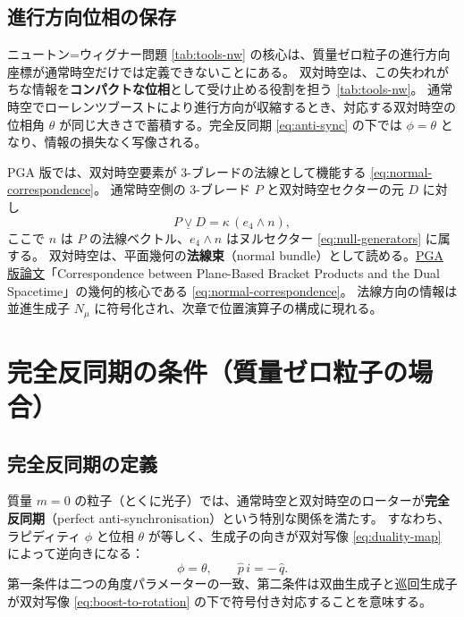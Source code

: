 \documentclass[dvipdfmx,a4paper,oneside]{jsbook}
\numberwithin{equation}{chapter}
\begin{document}
\subsection{進行方向位相の保存}

ニュートン=ウィグナー問題 \eqref{tab:tools-nw} の核心は、質量ゼロ粒子の進行方向座標が通常時空だけでは定義できないことにある。
双対時空は、この失われがちな情報を\textbf{コンパクトな位相}として受け止める役割を担う \eqref{tab:tools-nw}。
通常時空でローレンツブーストにより進行方向が収縮するとき、対応する双対時空の位相角 \(\theta\) が同じ大きさで蓄積する。完全反同期 \eqref{eq:anti-sync} の下では \(\phi = \theta\) となり、情報の損失なく写像される。

PGA 版では、双対時空要素が 3-ブレードの法線として機能する \eqref{eq:normal-correspondence}。
通常時空側の 3-ブレード \(P\) と双対時空セクターの元 \(D\) に対し
\begin{equation}
  P \mathbin{\underline{\vee}} D = \kappa\,(e_4 \wedge n),
  \label{eq:normal-correspondence-chapter}
\end{equation}
ここで \(n\) は \(P\) の法線ベクトル、\(e_4 \wedge n\) はヌルセクター \eqref{eq:null-generators} に属する。
双対時空は、平面幾何の\textbf{法線束}（normal bundle）として読める。\hyperref[sec:sister-manuscripts]{PGA 版論文}「Correspondence between Plane-Based Bracket Products and the Dual Spacetime」の幾何的核心である \eqref{eq:normal-correspondence}。
法線方向の情報は並進生成子 \(N_\mu\) に符号化され、次章で位置演算子の構成に現れる。

\section{完全反同期の条件（質量ゼロ粒子の場合）}

\subsection{完全反同期の定義}

質量 \(m = 0\) の粒子（とくに光子）では、通常時空と双対時空のローターが\textbf{完全反同期}（perfect anti-synchronisation）という特別な関係を満たす。
すなわち、ラピディティ \(\phi\) と位相 \(\theta\) が等しく、生成子の向きが双対写像 \eqref{eq:duality-map} によって逆向きになる：
\begin{equation}
  \boxed{\;
  \phi = \theta,
  \qquad
  \hat{p}\, i = -\,\hat{q}.
  \;}
  \label{eq:anti-sync}
\end{equation}
第一条件は二つの角度パラメーターの一致、第二条件は双曲生成子と巡回生成子が双対写像 \eqref{eq:boost-to-rotation} の下で符号付き対応することを意味する。
\end{document}
